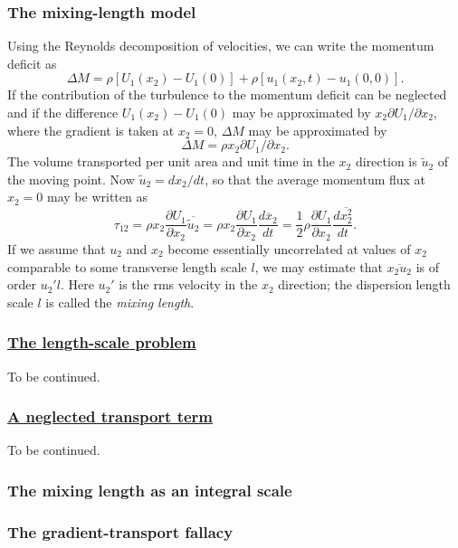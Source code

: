 \documentclass[review]{elsarticle}
\numberwithin{equation}{section}
\begin{document}
	\subsubsection{The mixing-length model}
		Using the Reynolds decomposition of velocities, we can write the momentum deficit as 
		\begin{equation}\label{MomDeficit2}
			\Delta M = \rho [U_1(x_2)-U_1(0)] + \rho[u_1(x_2,t)-u_1(0,0)].
		\end{equation}
		If the contribution of the turbulence to the momentum deficit can be neglected and if the difference $U_1(x_2)-U_1(0)$ 
		may be approximated by $x_2\partial U_1/\partial x_2$, where the gradient is taken at $x_2 = 0$, $\Delta M$ may be 
		approximated by 
		\begin{equation}
			\Delta M = \rho x_2\partial U_1/\partial x_2.
		\end{equation}  
		The volume transported per unit area and unit time in the $x_2$ direction is $\tilde{u}_2$ of the moving point. Now 
		$\tilde{u}_2=dx_2/dt$, so that the average momentum flux at $x_2=0$ may be written as
		\begin{equation}
			\tau_{12} = \rho x_2 \frac{\partial U_1}{\partial x_2}\overline{\tilde{u}_2} = 
			 \rho x_2 \frac{\partial U_1}{\partial x_2}\frac{d\overline{x}_2}{dt} = 
			 \frac{1}{2}\rho \frac{\partial U_1}{\partial x_2}\frac{d\overline{x_2^2}}{dt}.
		\end{equation}
		If we assume that $u_2$ and $x_2$ become essentially uncorrelated at values of $x_2$ comparable to some transverse 
		length scale $l$, we may estimate that $\overline{x_2u_2}$ is of order $u_2'l$. Here $u_2'$ is the rms velocity in 
		the $x_2$ direction; the dispersion length scale $l$ is called the \textit{mixing length}.
	\subsubsection{\underline{The length-scale problem}}
		To be continued.
	\subsubsection{\underline{A neglected transport term}}
		To be continued.
	\subsubsection{The mixing length as an integral scale}
	\subsubsection{The gradient-transport fallacy}
\end{document}
